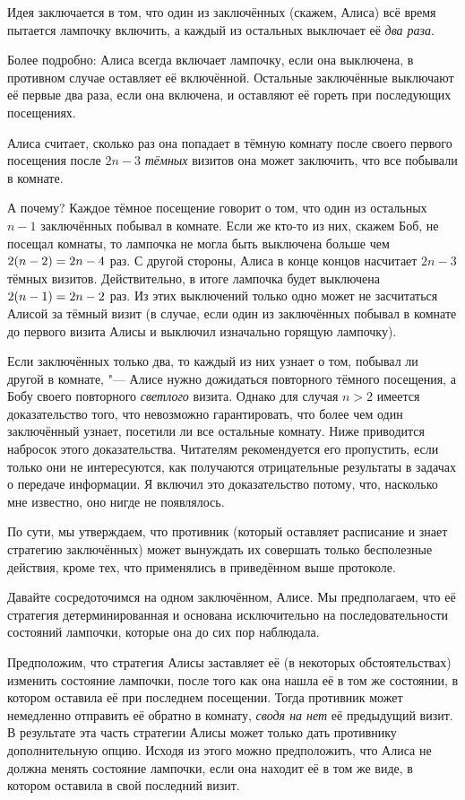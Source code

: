 \documentclass[twoside]{book}
\begin{document}
Идея заключается в том, что один из заключённых (скажем, Алиса) всё время пытается лампочку включить, а каждый из остальных выключает её \emph{два раза}.

Более подробно: Алиса всегда включает лампочку, если она выключена, в противном случае оставляет её включённой.
Остальные заключённые выключают её первые два раза, если она включена, и оставляют её гореть при последующих посещениях.

Алиса считает, сколько раз она попадает в тёмную комнату после своего первого 
посещения после $2n-3$ \emph{тёмных} визитов она может заключить, что все побывали в комнате.

А почему?
Каждое тёмное посещение говорит о том, что один из остальных $n-1$ заключённых побывал в комнате.
Если же кто-то из них, скажем Боб, не посещал комнаты, то лампочка не могла быть выключена больше чем $2(n-2)\z=2n-4$ раз.
С другой стороны, Алиса в конце концов насчитает $2n-3$ тёмных визитов.
Действительно, в итоге лампочка будет выключена $2(n-1)\z=2n-2$
раз.
Из этих выключений только одно может не засчитаться Алисой за тёмный визит (в случае, если один из заключённых побывал в комнате до первого визита Алисы и выключил изначально горящую лампочку).

Если заключённых только два, то каждый из них узнает о том, побывал ли другой в комнате, "---
Алисе нужно дожидаться повторного тёмного посещения, а Бобу своего повторного \emph{светлого} визита.
Однако для случая $n>2$ имеется доказательство того, что невозможно гарантировать, что более чем один заключённый узнает, посетили ли все остальные комнату.
Ниже приводится набросок этого доказательства.
Читателям рекомендуется его пропустить, если только они не интересуются, как получаются отрицательные результаты в задачах о передаче информации.
Я включил это доказательство потому, что, насколько мне известно, оно нигде не появлялось.

По сути, мы утверждаем, что противник (который оставляет расписание и знает стратегию заключённых) может вынуждать их совершать только бесполезные действия, кроме тех, что применялись в приведённом выше протоколе.

Давайте сосредоточимся на одном заключённом, Алисе.
Мы предполагаем, что её стратегия детерминированная и основана исключительно на последовательности состояний лампочки, которые она до сих пор наблюдала.

Предположим, что стратегия Алисы заставляет её (в некоторых обстоятельствах) изменить состояние лампочки, после того как она нашла её в том же состоянии, в котором оставила её при последнем посещении.
Тогда противник может немедленно отправить её обратно в комнату, \emph{сводя на нет} её предыдущий визит.
В результате эта часть стратегии Алисы может только дать противнику дополнительную опцию.
Исходя из этого можно предположить, что Алиса не должна менять состояние лампочки, если она находит её в том же виде, в котором оставила в свой последний визит.
\end{document}
